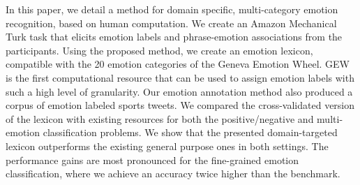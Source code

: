 In this paper, we detail a method for domain specific, multi-category emotion recognition, based on human computation. We create an Amazon Mechanical Turk
 task that elicits emotion labels and phrase-emotion associations from the
 participants. Using the proposed method, we create an emotion lexicon,
 compatible with the 20 emotion categories of the Geneva Emotion Wheel. GEW is
 the first computational resource that can be used to assign emotion labels with
 such a high level of granularity. Our emotion annotation method also produced a
 corpus of emotion labeled sports tweets. We compared the cross-validated
 version of the lexicon with existing resources for both the positive/negative
 and multi-emotion classification problems. We show that the presented
 domain-targeted lexicon outperforms the existing general purpose ones in both
 settings. The performance gains are most pronounced for the fine-grained
 emotion classification, where we achieve an accuracy twice higher than the
 benchmark.

